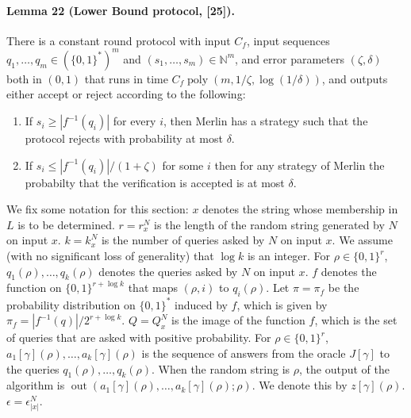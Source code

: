 \paragraph{Lemma 22 (Lower Bound protocol, [25]).} There is a constant round protocol with input $C_f$, input sequences $q_1,\ldots,q_m\in(\{0,1\}^*)^m$ and $(s_1,\ldots,s_m)\in\mathbb N^m$, and error parameters $(\zeta,\delta)$ both in $(0,1)$ that runs in time $C_f\operatorname{poly}(m,1/\zeta,\log(1/\delta))$, and outputs either accept or reject according to the following:
\begin{enumerate}\item If $s_i\ge|f^{-1}(q_i)|$ for every $i$, then Merlin has a strategy such that the protocol rejects with probability at most $\delta$.
\item If $s_i\le|f^{-1}(q_i)|/(1+\zeta)$ for some $i$ then for any strategy of Merlin the probabilty that the verification is accepted is at most $\delta$.\end{enumerate}
We fix some notation for this section: $x$ denotes the string whose membership in $L$ is to be determined. $r=r_x^N$ is the length of the random string generated by $N$ on input $x$. $k=k_x^N$ is the number of queries asked by $N$ on input $x$. We assume (with no significant loss of generality) that $\log k$ is an integer. For $\rho\in\{0,1\}^r$, $q_1(\rho),\ldots,q_k(\rho)$ denotes the queries asked by $N$ on input $x$. $f$ denotes the function on $\{0,1\}^{r+\log k}$ that maps $(\rho,i)$ to $q_i(\rho)$. Let $\pi=\pi_f$ be the probability distribution on $\{0,1\}^*$ induced by $f$, which is given by $\pi_f=|f^{-1}(q)|/2^{r+\log k}$. $Q=Q_x^N$ is the image of the function $f$, which is the set of queries that are asked with positive probability. For $\rho\in\{0,1\}^r$, $a_1[\gamma](\rho),\ldots,a_k[\gamma](\rho)$ is the sequence of answers from the oracle $J[\gamma]$ to the queries $q_1(\rho),\ldots,q_k(\rho)$. When the random string is $\rho$, the output of the algorithm is $\operatorname{out}(a_1[\gamma](\rho),\ldots,a_k[\gamma](\rho);\rho)$. We denote this by $z[\gamma](\rho)$. $\epsilon=\epsilon_{|x|}^N$.
